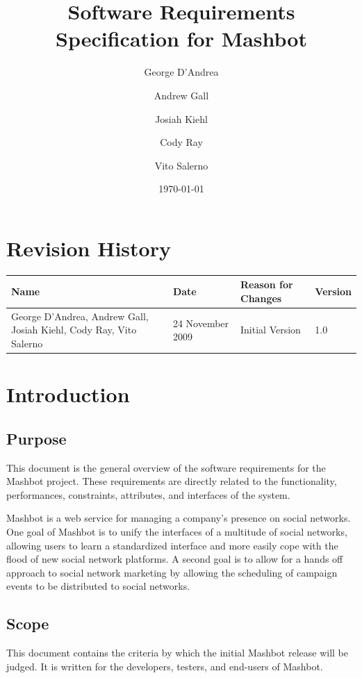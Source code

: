 \documentclass{report}
\begin{document}
\title{Software Requirements Specification for Mashbot} 
\author{George D'Andrea \and Andrew Gall \and Josiah Kiehl \and
  Cody Ray \and Vito Salerno}
\date{\today}
\begin{titlepage}
\maketitle
\end{titlepage}

\section*{Revision History}
\begin{tabular}{|p{2in}|l|l|l|}
  \hline
  \textbf{Name} & \textbf{Date} & \textbf{Reason for Changes} & \textbf{Version} \\
  \hline \hline
  George D'Andrea, Andrew Gall, Josiah Kiehl, Cody Ray, Vito
  Salerno & 24 November 2009 & Initial Version & 1.0 \\
  \hline
\end{tabular}


\tableofcontents
\clearpage

\section{Introduction}

\subsection{Purpose} %
This document is the general overview of the software requirements for
the Mashbot project. These requirements are directly related to the
functionality, performances, constraints, attributes, and interfaces
of the system.

Mashbot is a web service for managing a company's presence on social
networks. One goal of Mashbot is to unify the interfaces of a
multitude of social networks, allowing users to learn a standardized
interface and more easily cope with the flood of new social network
platforms. A second goal is to allow for a hands off approach to
social network marketing by allowing the scheduling of campaign events
to be distributed to social networks.
 
\subsection{Scope} %
This document contains the criteria by which the initial Mashbot
release will be judged. It is written for the developers, testers, and
end-users of Mashbot.
\end{document}
